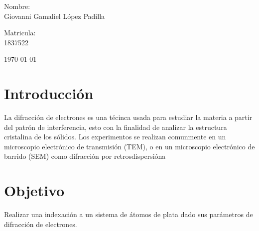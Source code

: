 \documentclass[reprint,amsmath,amssymb,aps,]{revtex4-2}
\begin{document}
\begin{titlepage}
\begin{center}
\begin{minipage}{0.6\linewidth}
\vspace{0.5cm}
\changefontsizes{14pt}
Nombre:\\
Giovanni Gamaliel López Padilla\\
\end{minipage}
\begin{minipage}{0.2\linewidth}
\changefontsizes{14pt}
Matricula:\\
1837522\\
\end{minipage}
\end{center}
\vspace{4cm}
\begin{flushright}
\today
\end{flushright}
\pagebreak
\end{titlepage}
\maketitle
\section{Introducción}
La difracción de electrones es una t\'ecinca usada para estudiar la 
materia a partir del patr\'on  de interferencia, esto con la finalidad de 
analizar la estructura cristalina de los s\'olidos. Los experimentos se realizan comunmente 
en un microscopio electr\'onico de transmisi\'on (TEM), o en un microscopio electrónico 
de barrido (SEM) como difracción por retrosdispersi\'ona
\section{Objetivo}
Realizar una indexación a un sistema de átomos de plata dado sus parámetros de difracción de electrones.
\end{document}
